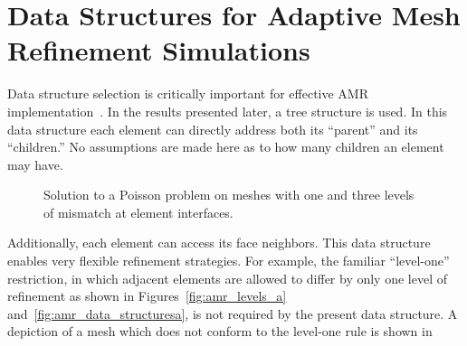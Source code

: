 \section{Data Structures for Adaptive Mesh Refinement Simulations\label{sec:amr_data_structures}}
Data structure selection is critically important for effective AMR
implementation~\cite{libMeshPaper,BHK07}. In the results presented
later, a tree structure is used.  In this data structure each element
can directly address both its ``parent'' and its ``children.'' No assumptions
are made here as to how many children an element may have.
\begin{figure}[hbtp]
  \begin{center}
    \caption{Solution to a Poisson problem on meshes with one and three levels of mismatch at element interfaces.\label{fig:amr_levels}}
  \end{center}
\end{figure}
Additionally, each element can access its face neighbors. This data
structure enables very flexible refinement strategies.  For example,
the familiar ``level-one'' restriction, in which adjacent elements are
allowed to differ by only one level of refinement as shown in
Figures~\ref{fig:amr_levels_a} and~\ref{fig:amr_data_structuresa}, is
not required by the present data structure.  A depiction of a mesh
which does not conform to the level-one rule is shown in
